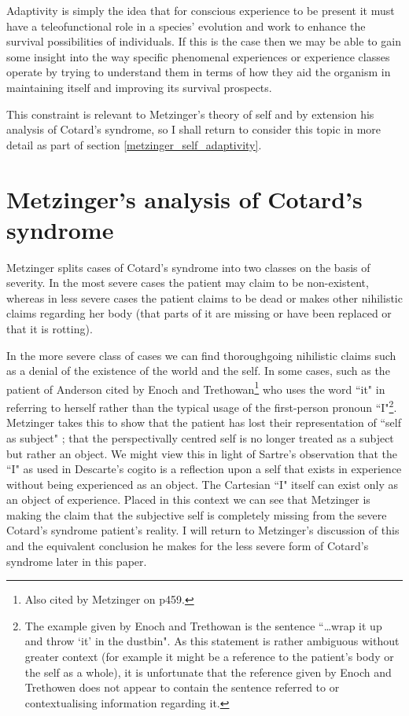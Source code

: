Adaptivity is simply the idea that for conscious experience to be present it must have a teleofunctional role in a species' evolution and work to enhance the survival possibilities of individuals. If this is the case then we may be able to gain some insight into the way specific phenomenal experiences or experience classes operate by trying to understand them in terms of how they aid the organism in maintaining itself and improving its survival prospects.

This constraint is relevant to Metzinger's theory of self and by extension his analysis of Cotard's syndrome, so I shall return to consider this topic in more detail as part of section \ref{metzinger_self_adaptivity}.

\section{Metzinger's analysis of Cotard's syndrome}

Metzinger splits cases of Cotard's syndrome into two classes on the basis of severity. In the most severe cases the patient may claim to be non-existent, whereas in less severe cases the patient claims to be dead or makes other nihilistic claims regarding her body (that parts of it are missing or have been replaced or that it is rotting).

In the more severe class of cases we can find thoroughgoing nihilistic claims such as a denial of the existence of the world and the self. In some cases, such as the patient of Anderson cited by Enoch and Trethowan\footnote{Also cited by Metzinger on p459.} \cite[p. 173]{enoch1991} who uses the word ``it" in referring to herself rather than the typical usage of the first-person pronoun ``I"\footnote{The example given by Enoch and Trethowan \cite{enoch1991} is the sentence ``\ldots wrap it up and throw `it' in the dustbin". As this statement is rather ambiguous without greater context (for example it might be a reference to the patient's body or the self as a whole), it is unfortunate that the reference given by Enoch and Trethowen \cite[p. 136]{tissot1921delire} does not appear to contain the sentence referred to or contextualising information regarding it.}. Metzinger takes this to show that the patient has lost their representation of ``self as subject" \cite[p. 461]{metzinger2003}; that the perspectivally centred self is no longer treated as a subject but rather an object. We might view this in light of Sartre's \citetext{\citealp{sartre1956}; \citealp{sartre1972}} observation that the ``I" as used in Descarte's cogito \cite{descartes1998} is a reflection upon a self that exists in experience without being experienced as an object. The Cartesian ``I" itself can exist only as an object of experience. Placed in this context we can see that Metzinger is making the claim that the subjective self is completely missing from the severe Cotard's syndrome patient's reality. I will return to Metzinger's discussion of this and the equivalent conclusion he makes for the less severe form of Cotard's syndrome later in this paper.

